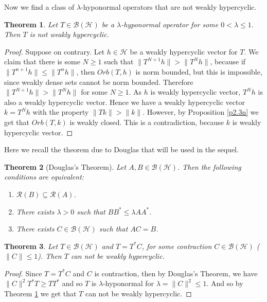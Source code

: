 \documentclass{amsart}
\newtheorem{thm}{Theorem}[section]
\theoremstyle{definition}\newtheorem{defn}[thm]{Definition}
\theoremstyle{remark}
\numberwithin{equation}{section}
\begin{document}
Now we find a class of $\lambda$-hyponormal operators that are not weakly hypercyclic.
\begin{thm}\label{t2.4n}
Let $T\in \mathcal{B}(\mathcal{H})$ be a $\lambda$-hyponormal operator for some $0<\lambda\leq 1$. Then $T$ is not weakly hypercyclic.
\end{thm}
\begin{proof}
Suppose on contrary. Let $h\in \mathcal{H}$ be a weakly hypercyclic vector for $T$. We claim that there is some $N\geq 1$ such that $\|T^{N+1}h\|>\|T^Nh\|$, because if $\|T^{n+1}h\|\leq \|T^nh\|$, then $Orb(T,h)$ is norm bounded, but this is impossible, since weakly dense sets cannot be norm bounded. Therefore $\|T^{N+1}h\|>\|T^Nh\|$ for some $N\geq 1$. As $h$ is weakly hypercyclic vector, $T^Nh$ is also a weakly hypercyclic vector. Hence we have a weakly hypercyclic vector $k=T^Nh$ with the property $\|Tk\|>\|k\|$. However, by Proposition \ref{p2.3n} we get that $Orb(T,k)$ is weakly closed. This is a contradiction, because $k$ is weakly hypercyclic vector.
\end{proof}

Here we recall the theorem due to Douglas \cite{Douglas1966} that will be used in the sequel.

\begin{thm}[Douglas's Theorem]\label{t1.1}
    Let \( A, B \in \mathcal{B}(\mathcal{H}) \). Then the following conditions are equivalent:
    \begin{enumerate}
        \item \( \mathcal{R}(B) \subseteq \mathcal{R}(A) \).
        \item There exists \( \lambda > 0 \) such that \( BB^* \leq \lambda A A^* \).
        \item There exists \(C \in \mathcal{B}(\mathcal{H}) \) such that \( AC = B \).
    \end{enumerate}
\end{thm}
\begin{thm} Let $T\in \mathcal{B}(\mathcal{H})$ and $T=T^*C$, for some contraction $C\in \mathcal{B}(\mathcal{H})$ ($\|C\|\leq 1$). Then $T$ can not be weakly hypercyclic.
\end{thm}
\begin{proof}
Since $T=T^*C$ and $C$ is contraction, then by Douglas's Theorem, we have $\|C\|^2T^*T\geq TT^*$ and so $T$ is $\lambda$-hyponormal for $\lambda=\|C\|^2\leq 1$. And so by Theorem \ref{t2.4n} we get that $T$ can not be weakly hypercyclic.
\end{proof}
\end{document}
